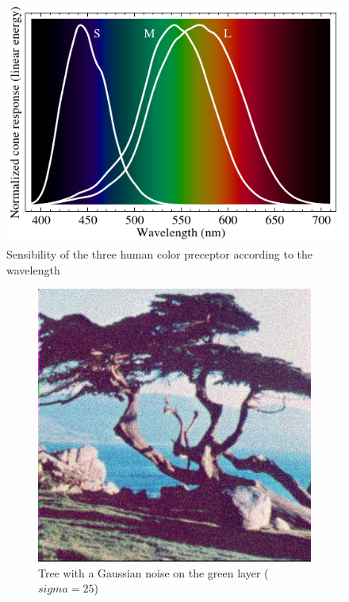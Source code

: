 \documentclass[a4paper,11pt]{article}
\begin{document}
\begin{figure}
  \centering
  \includegraphics[width=0.5\linewidth]{vision.png}
  \caption{Sensibility of the three human color preceptor according to the wavelength \cite{wiki:vision}}
  \label{vision}
\end{figure}

\begin{figure}
  \begin{center}
    \begin{subfigure}[t]{\textwidth}
      \centering
      \includegraphics[width=0.8\linewidth]{Images/ps0-5-a.png}
      \caption{Tree with a Gaussian noise on the green layer ($sigma=25$)}
      \label{q5a}
    \end{subfigure}
    \begin{subfigure}[t]{\textwidth}
      \centering

\end{subfigure}
\end{center}
\end{figure}
\end{document}
